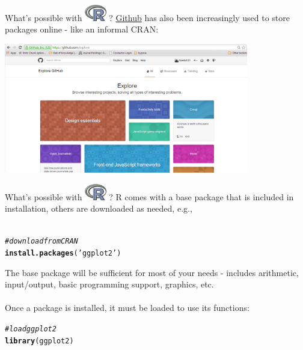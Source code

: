 \documentclass[xcolor=svgnames]{beamer}\usepackage[]{graphicx}\usepackage[]{color}
\makeatletter
\newcommand{\hlstr}[1]{\textcolor[rgb]{0.192,0.494,0.8}{#1}}%
\newcommand{\hlcom}[1]{\textcolor[rgb]{0.678,0.584,0.686}{\textit{#1}}}%
\newcommand{\hlstd}[1]{\textcolor[rgb]{0.345,0.345,0.345}{#1}}%
\newcommand{\hlkwd}[1]{\textcolor[rgb]{0.737,0.353,0.396}{\textbf{#1}}}%
\newenvironment{kframe}{%
 \def\at@end@of@kframe{}%
 \ifinner\ifhmode%
  \def\at@end@of@kframe{\end{minipage}}%
  \begin{minipage}{\columnwidth}%
 \fi\fi%
 \def\FrameCommand##1{\hskip\@totalleftmargin \hskip-\fboxsep
 \colorbox{shadecolor}{##1}\hskip-\fboxsep
     \hskip-\linewidth \hskip-\@totalleftmargin \hskip\columnwidth}%
 \MakeFramed {\advance\hsize-\width
   \@totalleftmargin\z@ \linewidth\hsize
   \@setminipage}}%
 {\par\unskip\endMakeFramed%
 \at@end@of@kframe}
\newenvironment{knitrout}{}{} %
\makeatother
\begin{document}
\begin{frame}[t]{What's possible with \includegraphics[width=0.07\textwidth]{Rlogo.jpg} \hspace{0.2em}? }
\href{https://github.com/}{Github} has also been increasingly used to store packages online  - like an informal CRAN:
\begin{center}
\includegraphics[width = 0.8\textwidth]{git.png}
\end{center}
\end{frame}

\begin{frame}[t,fragile]{What's possible with \includegraphics[width=0.07\textwidth]{Rlogo.jpg} \hspace{0.2em}? }
R comes with a base package that is included in installation, others are downloaded as needed, e.g.,\\~\\
\begin{knitrout}
\color{fgcolor}\begin{kframe}
\begin{alltt}
\hlcom{# download from CRAN}
\hlkwd{install.packages}\hlstd{(}\hlstr{'ggplot2'}\hlstd{)}
\end{alltt}
\end{kframe}
\end{knitrout}
\vspace{0.2in}
The base package will be sufficient for most of your needs - includes arithmetic, input/output, basic programming support, graphics, etc.\\~\\
Once a package is installed, it must be loaded to use its functions:
\begin{knitrout}
\color{fgcolor}\begin{kframe}
\begin{alltt}
\hlcom{# load ggplot2}
\hlkwd{library}\hlstd{(ggplot2)}
\end{alltt}
\end{kframe}
\end{knitrout}
\end{frame}
\end{document}
